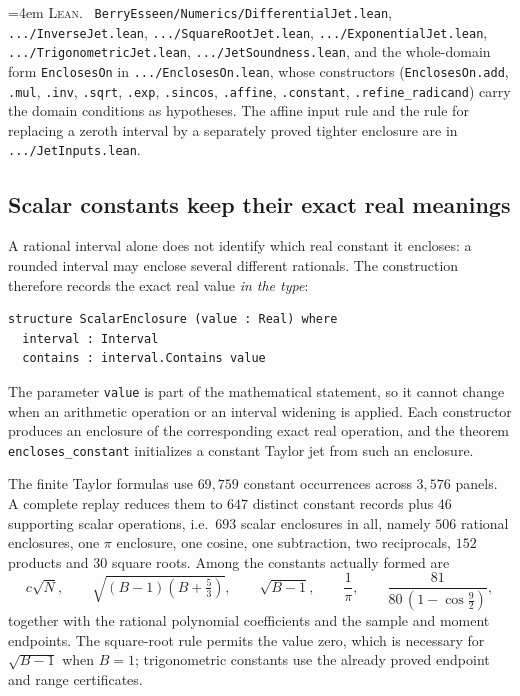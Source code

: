 \documentclass[10pt,a4paper]{article}
\theoremstyle{plain}
\theoremstyle{definition}
\newcommand{\lean}[1]{\texttt{#1}}
\newcommand{\file}[1]{\texttt{#1}}
\newenvironment{leanref}%
  {\par\addvspace{3pt}\begingroup\sloppy\emergencystretch=4em
   \noindent\footnotesize\textsc{Lean.}\ \ignorespaces}%
  {\par\endgroup\addvspace{3pt}}
\begin{document}
\begin{leanref}
\file{BerryEsseen/Numerics/DifferentialJet.lean},
\file{.../InverseJet.lean}, \file{.../SquareRootJet.lean},
\file{.../ExponentialJet.lean}, \file{.../TrigonometricJet.lean},
\file{.../JetSoundness.lean}, and the whole-domain form
\lean{EnclosesOn} in \file{.../EnclosesOn.lean}, whose constructors
(\lean{EnclosesOn.add}, \lean{.mul}, \lean{.inv}, \lean{.sqrt}, \lean{.exp},
\lean{.sincos}, \lean{.affine}, \lean{.constant}, \lean{.refine\_radicand})
carry the domain conditions as hypotheses. The affine input rule and the rule
for replacing a zeroth interval by a separately proved tighter enclosure are in
\file{.../JetInputs.lean}.
\end{leanref}

\subsection{Scalar constants keep their exact real meanings}
\label{sec:scalar-constants}

A rational interval alone does not identify which real constant it encloses: a
rounded interval may enclose several different rationals. The construction
therefore records the exact real value \emph{in the type}:
\begin{verbatim}
structure ScalarEnclosure (value : Real) where
  interval : Interval
  contains : interval.Contains value
\end{verbatim}
The parameter \lean{value} is part of the mathematical statement, so it cannot
change when an arithmetic operation or an interval widening is applied. Each
constructor produces an enclosure of the corresponding exact real operation, and
the theorem \lean{encloses\_constant} initializes a constant Taylor jet from
such an enclosure.

The finite Taylor formulas use $69{,}759$ constant occurrences across $3{,}576$
panels. A complete replay reduces them to $647$ distinct constant records plus
$46$ supporting scalar operations, i.e.\ $693$ scalar enclosures in all, namely
$506$ rational enclosures, one $\pi$ enclosure, one cosine, one subtraction,
two reciprocals, $152$ products and $30$ square roots. Among the constants
actually formed are
\[
  c\sqrt N, \qquad \sqrt{(B-1)(B+\tfrac53)}, \qquad \sqrt{B-1},
  \qquad \frac1\pi, \qquad \frac{81}{80\,(1-\cos\tfrac92)} ,
\]
together with the rational polynomial coefficients and the sample and moment
endpoints. The square-root rule permits the value zero, which is necessary for
$\sqrt{B-1}$ when $B=1$; trigonometric constants use the already proved
endpoint and range certificates.
\end{document}
